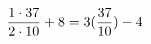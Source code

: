 \documentclass[preview]{standalone}
\begin{document}
\begin{align*}
\special{dvisvgm:raw <g id='unique000'>}\frac{1 \cdot 37}{2 \cdot 10} + 8 = 3(\frac{37}{10}) - 4\special{dvisvgm:raw </g>}
\end{align*}
\end{document}
